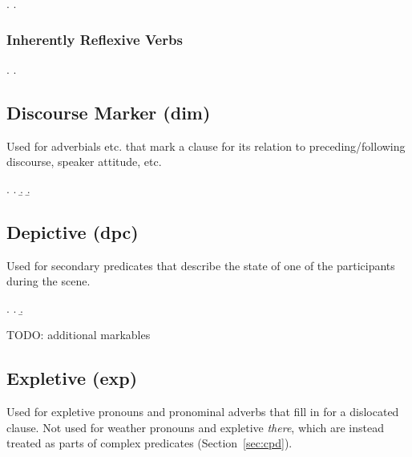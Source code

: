 \documentclass[a4paper]{article}
\begin{document}
\ex.
\a. 

\subsubsection{Inherently Reflexive Verbs}

\ex.
\a. 



\clearpage
\subsection{Discourse Marker (\textsf{dim})}
\label{sec:dim}

Used for adverbials etc. that mark a clause for its relation to preceding/following discourse, speaker attitude, etc.

\ex.
\a. 
\b. 
\b. 


\clearpage
\subsection{Depictive (\textsf{dpc})}
\label{sec:dpc}

Used for secondary predicates that describe the state of one of the participants during the scene.

\ex.
\a. 
\b. 

TODO: additional markables


\clearpage
\subsection{Expletive (\textsf{exp})}
\label{sec:exp}

Used for expletive pronouns and pronominal adverbs that fill in for a
dislocated clause. Not used for weather pronouns and expletive \emph{there},
which are instead treated as parts of complex predicates
(Section~\ref{sec:cpd}).
\end{document}
